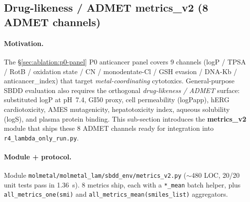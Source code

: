 
\subsection{Drug-likeness / ADMET metrics\_v2 (8 ADMET channels)}
\label{sec:ablation:metrics-v2}

\paragraph{Motivation.}
The §\ref{sec:ablation:p0-panel} P0 anticancer panel covers
9 channels (logP / TPSA / RotB / oxidation state / CN /
monodentate-Cl / GSH evasion / DNA-Kb / anticancer\_index) that
target \emph{metal-coordinating} cytotoxics.  General-purpose
SBDD evaluation also requires the orthogonal \emph{drug-likeness
/ ADMET} surface: substituted logP at pH~7.4, GI50 proxy,
cell permeability (logPapp), hERG cardiotoxicity, AMES
mutagenicity, hepatotoxicity index, aqueous solubility (logS),
and plasma protein binding.  This sub-section introduces the
\textbf{metrics\_v2} module that ships these 8 ADMET channels
ready for integration into \texttt{r4\_lambda\_only\_run.py}.

\paragraph{Module + protocol.}
Module \texttt{molmetal/molmetal\_lam/sbdd\_env/metrics\_v2.py}
($\sim$480 LOC, 20/20 unit tests pass in 1.36~s).  8 metrics
ship, each with a \texttt{*\_mean} batch helper, plus
\texttt{all\_metrics\_one(smi)} and
\texttt{all\_metrics\_mean(smiles\_list)} aggregators.

